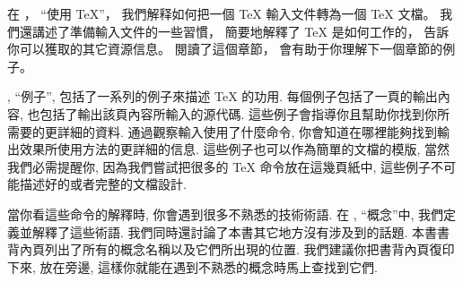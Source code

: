 在 ， ``使用 \TeX''，
我們解释如何把一個 \TeX{} 輸入文件轉為一個 \TeX{} 文檔。
我們還講述了準備輸入文件的一些習慣，
簡要地解釋了 \TeX{} 是如何工作的， 告訴你可以獲取的其它資源信息。
閱讀了這個章節， 會有助于你理解下一個章節的例子。


, ``例子'',
包括了一系列的例子來描述 \TeX{} 的功用.
每個例子包括了一頁的輸出內容, 也包括了輸出該頁內容所輸入的源代碼.
這些例子會指導你且幫助你找到你所需要的更詳細的資料.
通過觀察輸入使用了什麼命令, 
你會知道在哪裡能夠找到輸出效果所使用方法的更詳細的信息.
這些例子也可以作為簡單的文檔的模版, 當然我們必需提醒你, 
因為我們嘗試把很多的 \TeX{} 命令放在這幾頁紙中, 
這些例子不可能描述好的或者完整的文檔設計.


當你看這些命令的解釋時, 你會遇到很多不熟悉的技術術語.
在 , ``概念''中, 我們定義並解釋了這些術語.
我們同時還討論了本書其它地方沒有涉及到的話題.
本書書背內頁列出了所有的概念名稱以及它們所出現的位置.
我們建議你把書背內頁復印下來, 放在旁邊,
這樣你就能在遇到不熟悉的概念時馬上查找到它們.


